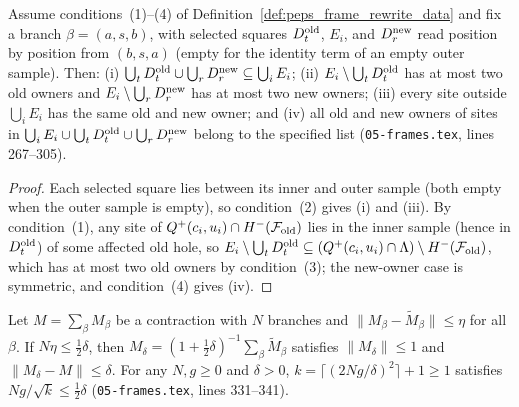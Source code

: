 \begin{lemma}
    \label{lem:peps_frame_wires}
    \leanok
    Assume conditions~(1)--(4) of Definition~\ref{def:peps_frame_rewrite_data} and fix a branch $\beta=(a,s,b)$, with selected squares $D^{\rm old}_t$, $E_i$, and $D^{\rm new}_r$ read position by position from $(b,s,a)$ (empty for the identity term of an empty outer sample). Then:
    (i) $\bigcup_t D^{\rm old}_t\cup\bigcup_r D^{\rm new}_r\subseteq\bigcup_i E_i$;
    (ii) $E_i\setminus\bigcup_t D^{\rm old}_t$ has at most two old owners and $E_i\setminus\bigcup_r D^{\rm new}_r$ has at most two new owners;
    (iii) every site outside $\bigcup_i E_i$ has the same old and new owner; and
    (iv) all old and new owners of sites in $\bigcup_i E_i\cup\bigcup_t D^{\rm old}_t\cup\bigcup_r D^{\rm new}_r$ belong to the specified list
    (\texttt{05-frames.tex}, lines 267--305).
\end{lemma}

\begin{proof}\leanok
    Each selected square lies between its inner and outer sample (both empty when the outer sample is empty), so condition~(2) gives (i) and (iii). By condition~(1), any site of $Q^+(c_i,u_i)\cap H^-(\mathcal F_{\rm old})$ lies in the inner sample (hence in $D^{\rm old}_t$) of some affected old hole, so $E_i\setminus\bigcup_t D^{\rm old}_t\subseteq (Q^+(c_i,u_i)\cap\Lambda)\setminus H^-(\mathcal F_{\rm old})$, which has at most two old owners by condition~(3); the new-owner case is symmetric, and condition~(4) gives (iv).
\end{proof}

\begin{lemma}
    \label{lem:peps_frame_rescale}
    \leanok
    Let $M=\sum_\beta M_\beta$ be a contraction with $N$ branches and
    $\lVert M_\beta-\widetilde M_\beta\rVert\le\eta$ for all $\beta$. If
    $N\eta\le\tfrac12\delta$, then
    $M_\delta=(1+\tfrac12\delta)^{-1}\sum_\beta\widetilde M_\beta$ satisfies
    $\lVert M_\delta\rVert\le1$ and $\lVert M_\delta-M\rVert\le\delta$. For any
    $N,g\ge0$ and $\delta>0$, $k=\lceil(2Ng/\delta)^2\rceil+1\ge1$ satisfies
    $Ng/\sqrt k\le\tfrac12\delta$ (\texttt{05-frames.tex}, lines 331--341).
\end{lemma}

